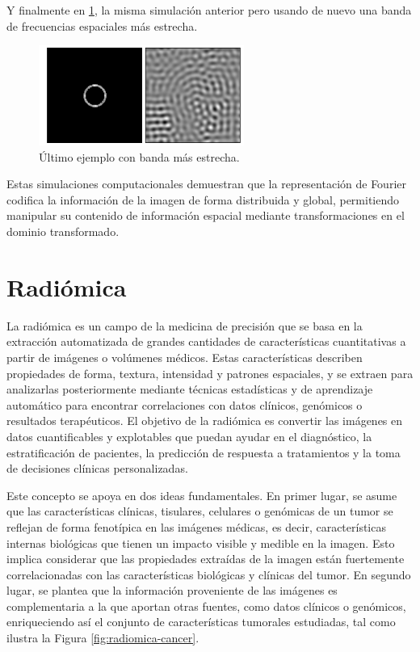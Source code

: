 Y finalmente en \ref{fig:pasabanda4}, la misma simulación anterior pero usando de nuevo una banda de frecuencias espaciales más estrecha.

\begin{figure}[!htbp]
    \centering
    \includegraphics[width=0.6\textwidth]{img/f11.png}
    \caption{Último ejemplo con banda más estrecha.}
    \label{fig:pasabanda4}
\end{figure}

Estas simulaciones computacionales demuestran que la representación de Fourier codifica la información de la imagen de forma distribuida y global, permitiendo manipular su contenido de información espacial mediante transformaciones en el dominio transformado.




\section{Radiómica} \label{sec:radiomica}

La radiómica es un campo de la medicina de precisión que se basa en la extracción automatizada de grandes cantidades de características cuantitativas a partir de imágenes o volúmenes médicos. Estas características describen propiedades de forma, textura, intensidad y patrones espaciales, y se extraen para analizarlas posteriormente mediante técnicas estadísticas y de aprendizaje automático para encontrar correlaciones con datos clínicos, genómicos o resultados terapéuticos. El objetivo de la radiómica es convertir las imágenes en datos cuantificables y explotables que puedan ayudar en el diagnóstico, la estratificación de pacientes, la predicción de respuesta a tratamientos y la toma de decisiones clínicas personalizadas.

Este concepto se apoya en dos ideas fundamentales. En primer lugar, se asume que las características clínicas, tisulares, celulares o genómicas de un tumor se reflejan de forma fenotípica en las imágenes médicas, es decir, características internas biológicas que tienen un impacto visible y medible en la imagen. Esto implica considerar que las propiedades extraídas de la imagen están fuertemente correlacionadas con las características biológicas y clínicas del tumor. En segundo lugar, se plantea que la información proveniente de las imágenes es complementaria a la que aportan otras fuentes, como datos clínicos o genómicos, enriqueciendo así el conjunto de características tumorales estudiadas, tal como ilustra la Figura \ref{fig:radiomica-cancer}.

